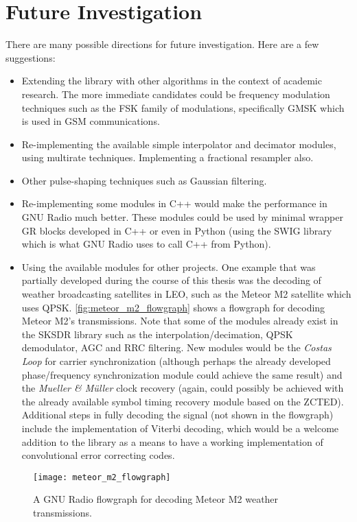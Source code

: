 \section{Future Investigation}
\label{sect:future_investigation}
There are many possible directions for future investigation. Here are a few suggestions:
\begin{itemize}
  \item Extending the library with other algorithms in the context of academic research. The more immediate candidates could be frequency modulation techniques such as the FSK family of modulations, specifically GMSK which is used in GSM communications.
  \item Re-implementing the available simple interpolator and decimator modules, using multirate techniques. Implementing a fractional resampler also.
  \item Other pulse-shaping techniques such as Gaussian filtering.
  \item Re-implementing some modules in C++ would make the performance in GNU Radio much better. These modules could be used by minimal wrapper GR blocks developed in C++ or even in Python (using the SWIG library which is what GNU Radio uses to call C++ from Python).
  \item Using the available modules for other projects. One example that was partially developed during the course of this thesis was the decoding of weather broadcasting satellites in LEO, such as the Meteor M2 satellite \cite{meteor_m2_sat} which uses QPSK. \autoref{fig:meteor_m2_flowgraph} shows a flowgraph for decoding Meteor M2's transmissions. Note that some of the modules already exist in the SKSDR library such as the interpolation/decimation, QPSK demodulator, AGC and RRC filtering. New modules would be the \emph{Costas Loop} for carrier synchronization (although perhaps the already developed phase/frequency synchronization module could achieve the same result) and the \emph{Mueller \& M{\"u}ller} clock recovery (again, could possibly be achieved with the already available symbol timing recovery module based on the ZCTED). Additional steps in fully decoding the signal (not shown in the flowgraph) include the implementation of Viterbi decoding, which would be a welcome addition to the library as a means to have a working implementation of convolutional error correcting codes.
\end{itemize}

\begin{figure}[ht]
  \centering
  \texttt{[image: meteor\_m2\_flowgraph]}
  \caption{A GNU Radio flowgraph for decoding Meteor M2 weather transmissions.}
  \label{fig:meteor_m2_flowgraph}
\end{figure}

